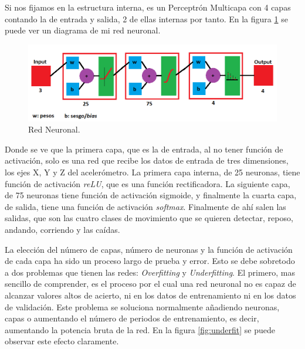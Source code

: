 \documentclass[12pt]{book}
\numberwithin{equation}{section}
\begin{document}
Si nos fijamos en la estructura interna, es un Perceptrón Multicapa con 4 capas contando la de entrada y salida, 2 de ellas internas por tanto. En la figura \ref{fig:redneuronal} se puede ver un diagrama de mi red neuronal.
\begin{figure}[h]
    \centering
    \includegraphics[width=1\textwidth]{miredneuronal.png}
    \caption{Red Neuronal.}
    \label{fig:redneuronal}
\end{figure}

Donde se ve que la primera capa, que es la de entrada, al no tener función de activación, solo es una red que recibe los datos de entrada de tres dimensiones, los ejes X, Y y Z del acelerómetro. La primera capa interna, de 25 neuronas, tiene función de activación \textit{reLU}, que es una función rectificadora. La siguiente capa, de 75 neuronas tiene función de activación sigmoide, y finalmente la cuarta capa, de salida, tiene una función de activación \textit{softmax}. Finalmente de ahí salen las salidas, que son las cuatro clases de movimiento que se quieren detectar, reposo, andando, corriendo y las caídas.

La elección del número de capas, número de neuronas y la función de activación de cada capa ha sido un proceso largo de prueba y error. Esto se debe sobretodo a dos problemas que tienen las redes: \textit{Overfitting} y \textit{Underfitting}. El primero, mas sencillo de comprender, es el proceso por el cual una red neuronal no es capaz de alcanzar valores altos de acierto, ni en los datos de entrenamiento ni en los datos de validación. Este problema se soluciona normalmente añadiendo neuronas, capas o aumentando el número de periodos de entrenamiento, es decir, aumentando la potencia bruta de la red. En la figura \ref{fig:underfit} se puede observar este efecto claramente.
\end{document}
